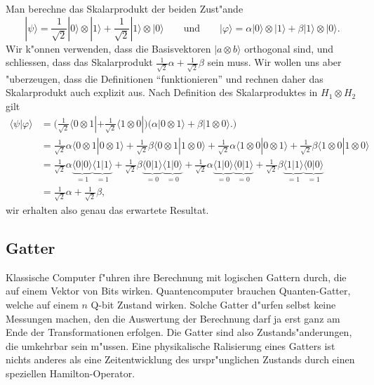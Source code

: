 \begin{beispiel}
Man berechne das Skalarprodukt der beiden Zust"ande
\[
|\psi\rangle
=
\frac1{\sqrt{2}} |0\rangle\otimes|1\rangle
+
\frac1{\sqrt{2}} |1\rangle\otimes|0\rangle
\qquad
\text{und}
\qquad
|\varphi\rangle
=
\alpha |0\rangle\otimes|1\rangle
+
\beta |1\rangle\otimes|0\rangle.
\]
Wir k"onnen verwenden, dass die Basisvektoren $|a\otimes b\rangle$ orthogonal
sind, und schliessen, dass das Skalarprodukt
$\frac1{\sqrt{2}}\alpha + \frac1{\sqrt{2}}\beta$ sein muss.
Wir wollen uns aber "uberzeugen, dass die Definitionen ``funktionieren''
und rechnen daher das Skalarprodukt auch explizit aus.
Nach Definition des Skalarproduktes in $H_1\otimes H_2$ gilt
\begin{align*}
\langle\psi|\varphi\rangle
&=
\biggl(
\frac1{\sqrt{2}} \langle 0 \otimes 1|
+
\frac1{\sqrt{2}} \langle 1\otimes0|
\biggr)
\biggl(
\alpha |0\otimes 1\rangle
+
\beta |1\otimes 0\rangle.
\biggr)
\\
&=
\frac1{\sqrt{2}} \alpha\langle 0\otimes 1|0\otimes 1\rangle
+
\frac1{\sqrt{2}} \beta \langle 0\otimes 1|1\otimes 0\rangle
+
\frac1{\sqrt{2}} \alpha\langle 1\otimes 0|0\otimes 1\rangle
+
\frac1{\sqrt{2}} \beta \langle 1\otimes 0|1\otimes 0\rangle
\\
&=
\frac1{\sqrt{2}} \alpha\underbrace{\langle 0|0\rangle}_{=1} \underbrace{\langle 1|1\rangle}_{=1}
+
\frac1{\sqrt{2}} \beta \underbrace{\langle 0|1\rangle}_{=0} \underbrace{\langle 1|0\rangle}_{=0}
+
\frac1{\sqrt{2}} \alpha\underbrace{\langle 1|0\rangle}_{=0} \underbrace{\langle 0|1\rangle}_{=0}
+
\frac1{\sqrt{2}} \beta \underbrace{\langle 1|1\rangle}_{=1} \underbrace{\langle 0|0\rangle}_{=1}
\\
&=
\frac1{\sqrt{2}}\alpha + \frac1{\sqrt{2}}\beta,
\end{align*}
wir erhalten also genau das erwartete Resultat.
\end{beispiel}

\subsection{Gatter}
Klassische Computer f"uhren ihre Berechnung mit logischen Gattern durch,
die auf einem Vektor von Bits wirken.
Quantencomputer brauchen Quanten-Gatter, welche auf einem
$n$ Q-bit Zustand wirken.
Solche Gatter d"urfen selbst keine Messungen machen, den die
Auswertung der Berechnung darf ja erst ganz am Ende der
Transformationen erfolgen.
Die Gatter sind also Zustands"anderungen, die umkehrbar sein m"ussen.
Eine physikalische Ralisierung eines Gatters ist nichts anderes
als eine Zeitentwicklung des urspr"unglichen Zustands durch einen
speziellen Hamilton-Operator.

